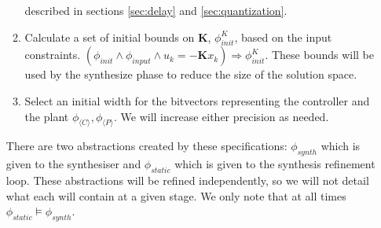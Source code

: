 \documentclass[sigconf]{llncs}
\newcommand{\mat}[1]{\boldsymbol{#1}}
\begin{document}
\begin{enumerate}
\begin{enumerate}
described in sections \ref{sec:delay} and \ref{sec:quantization}.
\item Calculate a set of initial bounds on $\mat{K}$, $\phi_\mathit{init}^{K}$,
based on the input constraints.
%
$(\phi_\mathit{init} \wedge \phi_\mathit{input} \wedge u_k=-\mat{K} x_k)
\Rightarrow \phi_\mathit{init}^{K}$.
These bounds will be used by the {\sc synthesize} phase to reduce the size of the solution space. 
\item Select an initial width for the bitvectors representing the controller and the plant $\phi_{\langle C \rangle}, \phi_{\langle P \rangle}$. We will increase either precision as needed.
\end{enumerate}
There are two abstractions created by these specifications: $\phi_{synth}$ which is given to the synthesiser and $\phi_{static}$ which is given to the synthesis refinement loop. These abstractions will be refined independently, so we will not detail what each will contain at a given stage. We only note that at all times $\phi_{static} \models \phi_{synth}$.


\end{enumerate}
\end{document}
